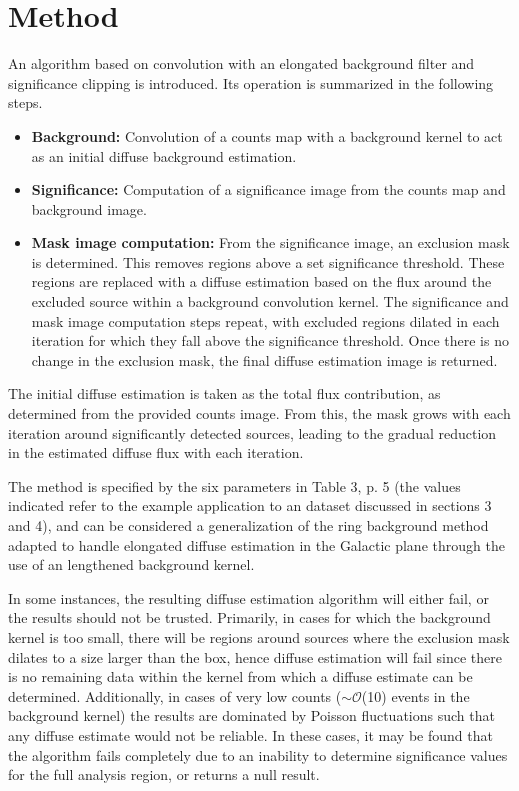 \documentclass{PoS}
\begin{document}
\section{Method}

An algorithm based on convolution with an elongated background filter and significance clipping is introduced. Its operation is summarized in the following steps.

\begin{itemize}[noitemsep,nolistsep]
\item \textbf{Background:} Convolution of a counts map with a background kernel to act as an initial diffuse background estimation.
\item \textbf{Significance:} Computation of a significance image from the counts map and background image.
\item \textbf{Mask image computation:} From the significance image, an exclusion mask is determined. This removes regions above a set significance threshold. These regions are replaced with a diffuse estimation based on the flux around the excluded source within a background convolution kernel. The significance and mask image computation steps repeat, with excluded regions dilated in each iteration for which they fall above the significance threshold. Once there is no change in the exclusion mask, the final diffuse estimation image is returned.
\end{itemize}

The initial diffuse estimation is taken as the total flux contribution, as determined from the provided counts image. From this, the mask grows with each iteration around significantly detected sources, leading to the gradual reduction in the estimated diffuse flux with each iteration.

The method is specified by the six parameters in Table 3, p. 5 (the values indicated refer to the example application to an dataset discussed in sections 3 and 4), and can be considered a generalization of the ring background method \cite{berge} adapted to handle elongated diffuse estimation in the Galactic plane through the use of an lengthened background kernel.

In some instances, the resulting diffuse estimation algorithm will either fail, or the results should not be trusted. Primarily, in cases for which the background kernel is too small, there will be regions around sources where the exclusion mask dilates to a size larger than the box, hence diffuse estimation will fail since there is no remaining data within the kernel from which a diffuse estimate can be determined. Additionally, in cases of very low counts (\textbf{$\sim\mathcal{O}$}(10) events in the background kernel) the results are dominated by Poisson fluctuations such that any diffuse estimate would not be reliable. In these cases, it may be found that the algorithm fails completely due to an inability to determine significance values for the full analysis region, or returns a null result.
\end{document}
